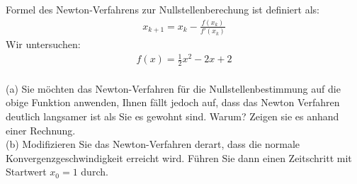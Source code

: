 \documentclass{scrartcl}
\begin{document}

Formel des Newton-Verfahrens zur Nullstellenberechung ist definiert als:
\begin{align*}
x_{k+1} = x_k - \frac{f(x_k)}{f'(x_k)}
\end{align*}
Wir untersuchen:
\begin{align*}
f(x) = \frac{1}{2}x^2 - 2x + 2
\end{align*}
\\
(a)
Sie möchten das Newton-Verfahren für die Nullstellenbestimmung auf die obige Funktion anwenden, Ihnen fällt jedoch auf, dass das Newton Verfahren deutlich langsamer ist als Sie es gewohnt sind. Warum? Zeigen sie es anhand einer Rechnung.
\\
(b)
Modifizieren Sie das Newton-Verfahren derart, dass die normale Konvergenzgeschwindigkeit erreicht wird.
\n 
Führen Sie dann einen Zeitschritt mit Startwert $x_0=1$ durch.
\end{document}
